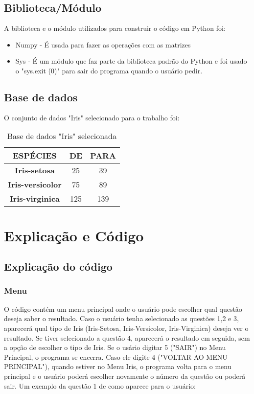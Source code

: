\documentclass[a4paper,12pt,twoside]{article}
\begin{document}
\subsection{Biblioteca/Módulo}
A biblioteca e o módulo utilizados para construir o código em Python foi:
\begin{itemize}
   \item Numpy - É usada para fazer as operações com as matrizes
   \item Sys - É um módulo que faz parte da biblioteca padrão do Python e foi usado o "sys.exit (0)" para sair do programa quando o usuário pedir.
 \end{itemize}
 \subsection{Base de dados}
 O  conjunto de dados "Iris" selecionado para o trabalho foi:
 \begin{table}[H]
\begin{tabular}{|c|c|c|} \hline
\textbf{ESPÉCIES} & DE & PARA \\\hline
\textbf{Iris-setosa}  & 25 & 39 \\\hline
\textbf{Iris-versicolor} & 75 & 89  \\\hline
\textbf{Iris-virginica} & 125 & 139 \\\hline

 
\end{tabular}
\label{tabela2}
\centering
\caption{Base de dados "Iris" selecionada}
\label {tabela2}
\end{table}



\section{Explicação e Código}
\subsection{Explicação do código}

\subsubsection{Menu}
O código contém um menu principal onde o usuário pode escolher qual questão deseja saber o resultado. Caso o usuário tenha selecionado as questões 1,2 e 3, aparecerá qual tipo de Iris (Iris-Setosa, Iris-Versicolor, Iris-Virginica) deseja ver o resultado. Se tiver selecionado a questão 4, aparecerá o resultado em seguida, sem a opção de escolher o tipo de Iris. Se o usário digitar 5 ("SAIR") no Menu Principal, o programa se encerra. Caso ele digite 4 ("VOLTAR AO MENU PRINCIPAL"), quando estiver no Menu Iris, o programa volta para o menu principal e o usuário poderá escolher novamente o número da questão ou poderá sair. 
Um exemplo da questão 1 de como aparece para o usuário:
\end{document}
